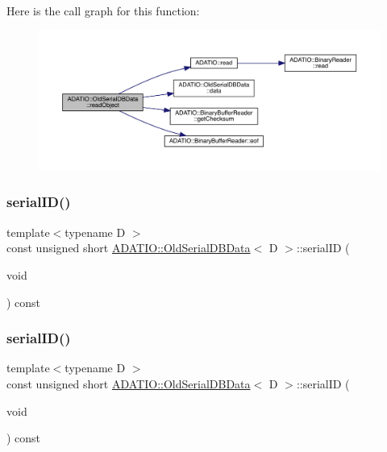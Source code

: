Here is the call graph for this function\+:
\nopagebreak
\begin{figure}[H]
\begin{center}
\leavevmode
\includegraphics[width=350pt]{da/dbc/classADATIO_1_1OldSerialDBData_aad0338cd19224fe3eb6223afe7e2c2c4_cgraph}
\end{center}
\end{figure}
\mbox{\label{classADATIO_1_1OldSerialDBData_a379c8edee426f2a5ce3f41d0c46777de}} 
\subsubsection{\texorpdfstring{serialID()}{serialID()}\hspace{0.1cm}{\footnotesize\ttfamily [1/3]}}
{\footnotesize\ttfamily template$<$typename D $>$ \\
const unsigned short \mbox{\hyperlink{classADATIO_1_1OldSerialDBData}{A\+D\+A\+T\+I\+O\+::\+Old\+Serial\+D\+B\+Data}}$<$ D $>$\+::serial\+ID (\begin{DoxyParamCaption}\item[{void}]{ }\end{DoxyParamCaption}) const\hspace{0.3cm}{\ttfamily [inline]}}

\mbox{\label{classADATIO_1_1OldSerialDBData_a379c8edee426f2a5ce3f41d0c46777de}} 
\subsubsection{\texorpdfstring{serialID()}{serialID()}\hspace{0.1cm}{\footnotesize\ttfamily [2/3]}}
{\footnotesize\ttfamily template$<$typename D $>$ \\
const unsigned short \mbox{\hyperlink{classADATIO_1_1OldSerialDBData}{A\+D\+A\+T\+I\+O\+::\+Old\+Serial\+D\+B\+Data}}$<$ D $>$\+::serial\+ID (\begin{DoxyParamCaption}\item[{void}]{ }\end{DoxyParamCaption}) const\hspace{0.3cm}{\ttfamily [inline]}}

